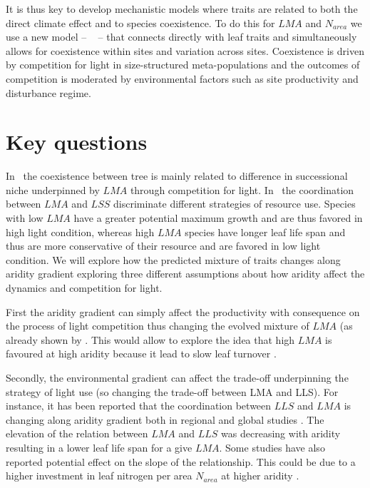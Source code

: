 \documentclass[a4paper,11pt]{article}
\begin{document}
It is thus key to develop mechanistic models where traits are related to both the direct climate effect and to species coexistence. To do this for $LMA$ and $N_{area}$ we use a new model -- \plant\ \citep{Falster-2016,Falster-2017} -- that connects directly with leaf traits and simultaneously allows for coexistence within sites and variation across sites. Coexistence is driven by competition for light in size-structured meta-populations and the outcomes of competition is moderated by environmental factors such as site productivity and disturbance regime.

\section{Key questions}

In \plant\ the coexistence between tree is mainly related to difference in successional niche underpinned by $LMA$ through competition for light. In \plant\ the coordination between $LMA$ and $LSS$ discriminate different strategies of resource use. Species with low $LMA$ have a greater potential maximum growth and are thus favored in high light condition, whereas high $LMA$ species have longer leaf life span and thus are more conservative of their resource and are favored in low light condition.  We will explore how the predicted mixture of traits changes along aridity gradient exploring three different assumptions about how aridity
affect the dynamics and competition for light. 

First the aridity gradient can simply affect
the productivity with consequence on the process of light
competition thus changing the evolved mixture of $LMA$ (as already shown by \citep{Falster-2017}. This would allow to explore the idea that high $LMA$ is favoured at high aridity because it lead to slow leaf turnover \citep{Wright-2002b}. 


Secondly, the environmental gradient can affect the
trade-off underpinning the strategy of light use (so changing the
trade-off between LMA and LLS). For instance, it has been reported that the coordination between $LLS$ and $LMA$ is changing along aridity gradient both in regional \citep{Wright-2002b} and global studies \citep{Wright-2004}. The elevation of the relation between $LMA$ and $LLS$ was decreasing with aridity resulting in a lower leaf life span for a give $LMA$. Some studies have also reported potential effect on the slope of the relationship. This could be due to a higher investment in leaf nitrogen per area $N_{area}$ at higher aridity \citep{Wright-2002b}. 
\end{document}
